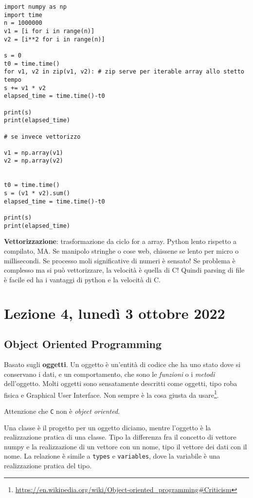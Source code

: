 \documentclass[10pt, a4paper, titlepage]{book}
\begin{document}
\begin{verbatim}
import numpy as np
import time
n = 1000000
v1 = [i for i in range(n)]
v2 = [i**2 for i in range(n)]

s = 0
t0 = time.time()
for v1, v2 in zip(v1, v2): # zip serve per iterable array allo stetto tempo
s += v1 * v2
elapsed_time = time.time()-t0

print(s)
print(elapsed_time)

# se invece vettorizzo

v1 = np.array(v1)
v2 = np.array(v2)


t0 = time.time()
s = (v1 * v2).sum()
elapsed_time = time.time()-t0

print(s)
print(elapsed_time)
\end{verbatim}

\textbf{Vettorizzazione}: trasformazione da ciclo for a array. Python lento rispetto a compilato, MA. Se manipolo stringhe o cose web, chissene se lento per micro o millisecondi. Se processo moli significative di numeri è sensato!
Se problema è complesso ma si può vettorizzare, la velocità è quella di C! Quindi parsing di file è facile ed ha i vantaggi di python e la velocità di C.


\section{Lezione 4, lunedì 3 ottobre 2022}

\subsection{Object Oriented Programming}

Basato sugli \textbf{oggetti}. Un oggetto è un'entità di codice che ha uno stato dove si conservano i dati, e un comportamento, che sono le \textit{funzioni} o i \textit{metodi} dell'oggetto. 
Molti oggetti sono sensatamente descritti come oggetti, tipo roba fisica e Graphical User Interface. Non sempre è la cosa giusta da usare\footnote{
\url{https://en.wikipedia.org/wiki/Object-oriented_programming#Criticism}
}.

Attenzione che \texttt{C} non è \textit{object oriented}.

Una classe è il progetto per un oggetto diciamo, mentre l'oggetto è la realizzazione pratica di una classe. Tipo la differenza fra il concetto di vettore numpy e la realizzazione di un vettore con un nome, tipo il vettore dei dati con il nome.
La relazione è simile a \texttt{types} e \texttt{variables}, dove la variabile è una realizzazione pratica del tipo.
\end{document}

